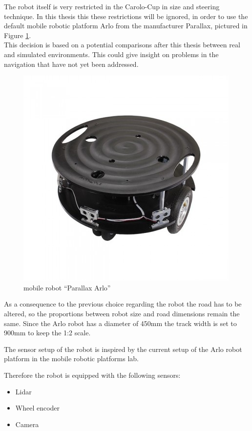 The robot itself is very restricted in the Carolo-Cup in size and steering technique. In this thesis this these restrictions will be ignored, in order to use the default mobile robotic platform Arlo from the manufacturer Parallax, pictured in Figure \ref{arlore}.\\

This decision is based on a potential comparisons after this thesis between real and simulated environments. This could give insight on problems in the navigation that have not yet been addressed.\\


\begin{figure}[H]
	\centering
	\includegraphics[width=.7\textwidth]{arlo real}
	
	\caption{mobile robot ``Parallax Arlo'' \cite{arloreal}}
	\label{arlore}
\end{figure}

As a consequence to the previous choice regarding the robot the road has to be altered, so the proportions between robot size and road dimensions remain the same. Since the Arlo robot has a diameter of 450mm the track width is set to 900mm to keep the 1:2 scale.

The sensor setup of the robot is inspired by the current setup of the Arlo robot platform in the mobile robotic platforms lab.

Therefore the robot is equipped with the following sensors:

\begin{itemize}
	\item Lidar
	\item Wheel encoder
	\item Camera
\end{itemize}

